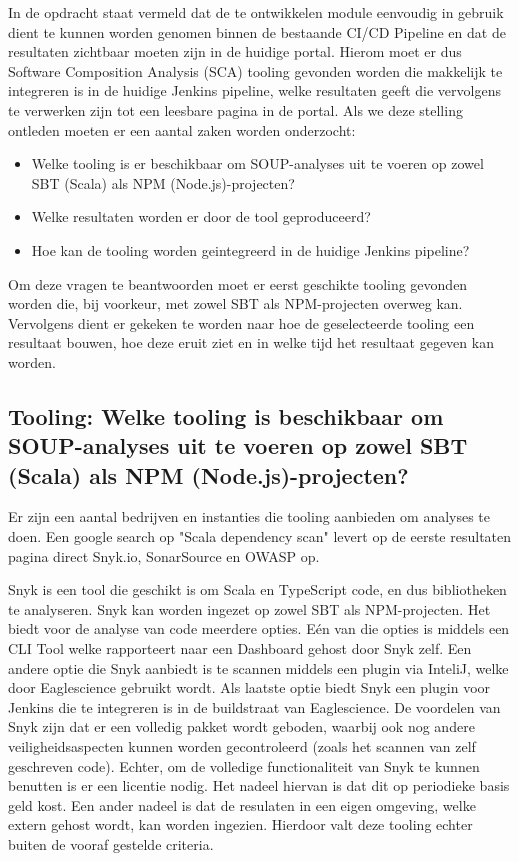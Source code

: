 \begin{itemize}
    In de opdracht staat vermeld dat de te ontwikkelen module eenvoudig in gebruik dient te kunnen worden genomen binnen de bestaande CI/CD Pipeline en dat de resultaten zichtbaar moeten zijn in de huidige portal. Hierom moet er dus Software Composition Analysis (SCA) tooling gevonden worden die makkelijk te integreren is in de huidige Jenkins pipeline, welke resultaten geeft die vervolgens te verwerken zijn tot een leesbare pagina in de portal. Als we deze stelling ontleden moeten er een aantal zaken worden onderzocht:
    \begin{itemize}
        \item Welke tooling is er beschikbaar om SOUP-analyses uit te voeren op zowel SBT (Scala) als NPM (Node.js)-projecten?
        \item Welke resultaten worden er door de tool geproduceerd?
        \item Hoe kan de tooling worden geintegreerd in de huidige Jenkins pipeline?
    \end{itemize}
    Om deze vragen te beantwoorden moet er eerst geschikte tooling gevonden worden die, bij voorkeur, met zowel SBT als NPM-projecten overweg kan. Vervolgens dient er gekeken te worden naar hoe de geselecteerde tooling een resultaat bouwen, hoe deze eruit ziet en in welke tijd het resultaat gegeven kan worden.

    \subsection{Tooling: Welke tooling is beschikbaar om SOUP-analyses uit te voeren op zowel SBT (Scala) als NPM (Node.js)-projecten?}\label{subsec:ESTooling}
    Er zijn een aantal bedrijven en instanties die tooling aanbieden om analyses te doen. Een google search op "Scala dependency scan" levert op de eerste resultaten pagina direct Snyk.io, SonarSource en OWASP op.

    Snyk is een tool die geschikt is om Scala en TypeScript code, en dus bibliotheken te analyseren. Snyk kan worden ingezet op zowel SBT als NPM-projecten. Het biedt voor de analyse van code meerdere opties. Eén van die opties is middels een CLI Tool welke rapporteert naar een Dashboard gehost door Snyk zelf. Een andere optie die Snyk aanbiedt is te scannen middels een plugin via InteliJ, welke door Eaglescience gebruikt wordt. Als laatste optie biedt Snyk een plugin voor Jenkins die te integreren is in de buildstraat van Eaglescience. De voordelen van Snyk zijn dat er een volledig pakket wordt geboden, waarbij ook nog andere veiligheidsaspecten kunnen worden gecontroleerd (zoals het scannen van zelf geschreven code). Echter, om de volledige functionaliteit van Snyk te kunnen benutten is er een licentie nodig. Het nadeel hiervan is dat dit op periodieke basis geld kost. Een ander nadeel is dat de resulaten in een eigen omgeving, welke extern gehost wordt, kan worden ingezien. Hierdoor valt deze tooling echter buiten de vooraf gestelde criteria.


\end{itemize}
